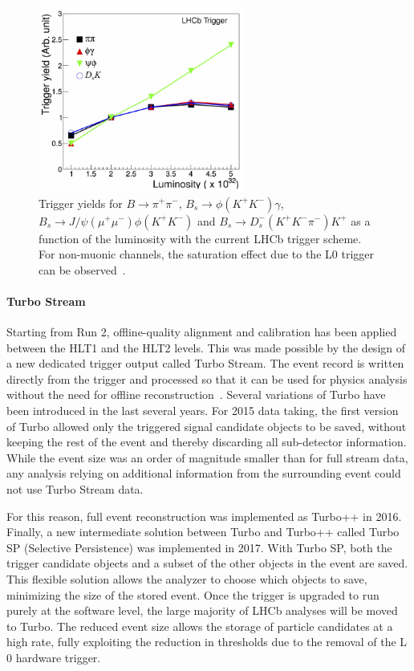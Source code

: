 \begin{figure}[t]
\centerline{\includegraphics[width=0.6\textwidth]{figures/L0vsLumi.pdf}}
\caption{Trigger yields for ${B\to\pi^+\pi^-}$, ${B_s\to\phi(K^+K^-)\gamma}$, ${B_s\to J/\psi(\mu^+\mu^-)\phi(K^+K^-)}$ and ${B_s\to D_s^-(K^+K^-\pi^-)K^+}$ as a function of the luminosity with the current LHCb trigger scheme. For non-muonic channels, the saturation effect due to the L$0$ trigger can be observed~\cite{Albrecht:2014kba}.}
  \label{fig:triggervsLumi}
\end{figure}

\paragraph{Turbo Stream}

Starting from Run 2, offline-quality alignment and calibration has been applied between the HLT1 and the HLT2 levels. This was made possible by the design of a new dedicated trigger output called Turbo Stream. The event record is written directly from the trigger and processed so that it can be used for physics analysis without the need for offline reconstruction~\cite{Aaij:2016rxn}. Several variations of Turbo have been introduced in the last several
years. For 2015 data taking, the first version of Turbo allowed only the triggered signal candidate objects to be saved, without keeping the rest of the event and thereby discarding all sub-detector information. While the event size was an order of magnitude smaller than for full stream data, any analysis relying on additional information from the surrounding event could not use Turbo Stream data.

For this reason, full event reconstruction was implemented as Turbo++ in 2016. Finally, a new intermediate solution between Turbo and Turbo++ called Turbo SP (Selective Persistence) was implemented in 2017. With Turbo SP, both the trigger candidate objects and a subset of the other objects in the event are saved. This flexible solution allows the analyzer to choose which objects to save, minimizing the size of the stored event. Once the trigger is upgraded to run purely at the software level, the large majority of LHCb analyses will be moved to Turbo. The reduced event size allows the storage of particle candidates at a high rate, fully exploiting the reduction in \pt thresholds due to the removal of the L$0$ hardware trigger.



